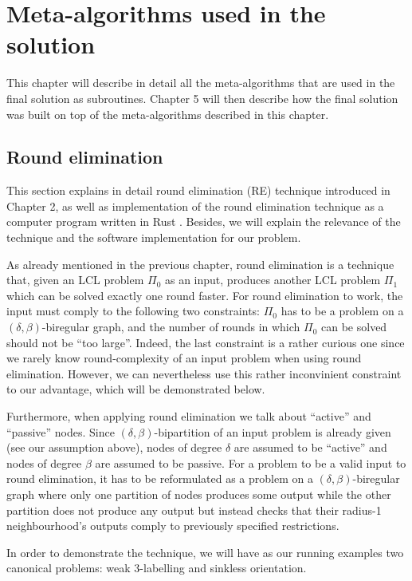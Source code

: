 \chapter{Meta-algorithms used in the solution}
\label{chapter:environment}

This chapter will describe in detail all the meta-algorithms that are
used in the final solution as subroutines.
Chapter 5 will then
describe how the final solution was built on top of the meta-algorithms
described in this chapter.

\section{Round elimination}

This section explains in detail round elimination (RE)
technique introduced in Chapter 2, as well as
implementation of the round elimination technique as a computer
program written in Rust \cite{Brandt2019, Olivetti2020}.
Besides, we will explain the relevance of the technique
and the software implementation for our problem.

As already mentioned in the previous chapter, round elimination
is a technique that, given an LCL problem $\Pi_0$ as an input, produces
another LCL problem $\Pi_1$ which can be solved exactly one round
faster. For round elimination to work, the input must comply
to the following two constraints: $\Pi_0$ has to be a problem on a $(\delta, \beta)$-biregular
graph, and the number of rounds in which $\Pi_0$ can be solved
should not be ``too large''. Indeed, the last constraint is a rather curious one
since we rarely know round-complexity of an input problem when using
round elimination. However, we can nevertheless use this rather inconvinient constraint
to our advantage, which will be demonstrated below.

Furthermore, when applying round elimination we talk about ``active'' and
``passive'' nodes. Since $(\delta, \beta)$-bipartition of an input problem is
already given (see our assumption above), nodes of degree $\delta$ are assumed
to be ``active'' and nodes of degree $\beta$ are assumed to be passive. For a problem
to be a valid input to round elimination, it has to be reformulated as a problem on
a $(\delta, \beta)$-biregular graph where only one partition of nodes produces
some output while the other partition does not produce any output but instead
checks that their radius-1 neighbourhood's outputs comply to previously
specified restrictions.

In order to demonstrate the technique, we will have as our running
examples two canonical problems: weak 3-labelling and sinkless orientation.

